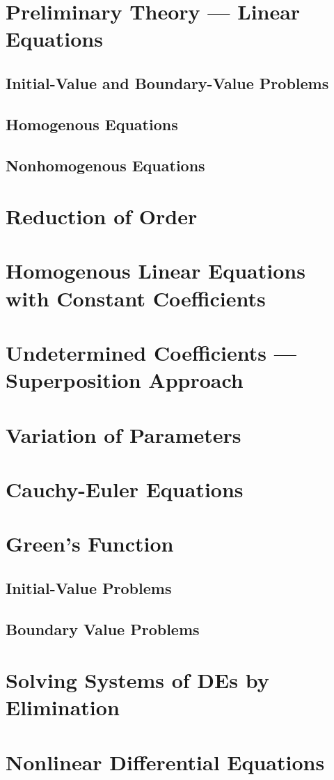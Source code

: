 \documentclass[./Differential Equations]{subfiles}
\begin{document}
	\section{Preliminary Theory --- Linear Equations}	
		\subsection{Initial-Value and Boundary-Value Problems}
		\subsection{Homogenous Equations}
		\subsection{Nonhomogenous Equations}
	\section{Reduction of Order}
	\section{Homogenous Linear Equations with Constant Coefficients}
	\section{Undetermined Coefficients --- Superposition Approach}
	\section{Variation of Parameters}
	\section{Cauchy-Euler Equations}
	\section{Green's Function}
		\subsection{Initial-Value Problems}
		\subsection{Boundary Value Problems}
	\section{Solving Systems of DEs by Elimination}
	\section{Nonlinear Differential Equations}
\end{document}
